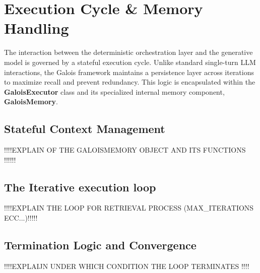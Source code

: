 \section{Execution Cycle \& Memory Handling}
The interaction between the deterministic orchestration layer and the generative model is governed by a stateful execution cycle. Unlike standard single-turn LLM interactions, the Galois framework maintains a persistence layer across iterations to maximize recall and prevent redundancy. This logic is encapsulated within the \textbf{GaloisExecutor} class and its specialized internal memory component, \textbf{GaloisMemory}.

\subsection{Stateful Context Management}
!!!!EXPLAIN OF THE GALOISMEMORY OBJECT AND ITS FUNCTIONS !!!!!!

\subsection{The Iterative execution loop}
!!!!EXPLAIN THE LOOP FOR RETRIEVAL PROCESS (MAX\_ITERATIONS ECC...)!!!!!

\subsection{Termination Logic and Convergence}
!!!!EXPLAIJN UNDER WHICH CONDITION THE LOOP TERMINATES !!!!